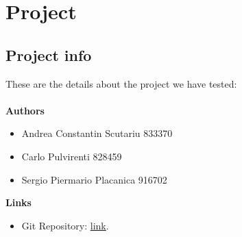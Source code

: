 \section{Project}

\subsection{Project info}
These are the details about the project we have tested:\\\\
\textbf{Authors}
\begin{itemize}
	\item Andrea Constantin Scutariu 833370
	\item Carlo Pulvirenti 828459
	\item Sergio Piermario Placanica 916702\\
\end{itemize}
\textbf{Links}
\begin{itemize}
	\item Git Repository: \href{https://github.com/xnand/ScutariuPlacanicaPulvirenti}{link}.
\end{itemize}
